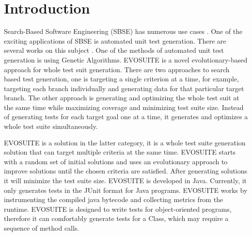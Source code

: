 \documentclass[sigconf]{acmart}
\begin{document}



\maketitle

\section{Introduction}
Search-Based Software Engineering (SBSE) has numerous use cases \cite{10.1145/2379776.2379787,Harman2012}.
One of the exciting applications of SBSE is automated unit test generation. There are several works on this
subject \cite{57624,6004309,10.1145/1276958.1277172,10.1145/1013886.1007528}. One of the methods of automated
unit test generation is using Genetic Algorithms. EVOSUITE \cite{6004309} is 
a novel evolutionary-based approach for whole test suit generation. There are two approaches to search 
based test generation, one is targeting a single criterion at a time, for example, targeting each branch
individually and generating data for that particular target branch. The other approach is generating and 
optimizing the whole test suit at the same time while maximizing coverage and minimizing test suite size. 
Instead of generating tests for each target goal one at a time, it generates and optimizes a whole test suite 
simultaneously. 

EVOSUITE is a solution in the latter category, it is a whole test suite generation solution that can
target multiple criteria at the same time. EVOSUITE starts with a random set of initial solutions and uses 
an evolutionary approach to improve solutions until the chosen criteria are satisfied.
After generating solutions it will minimize the test suite size. EVOSUITE is developed in Java. Currently, 
it only generates tests in the JUnit format for Java programs. EVOSUITE works by instrumenting the compiled 
java bytecode and collecting metrics from the runtime. EVOSUITE is designed to write tests 
for object-oriented programs, therefore it can comfortably generate tests for a Class, 
which may require a sequence of method calls. 
\end{document}
